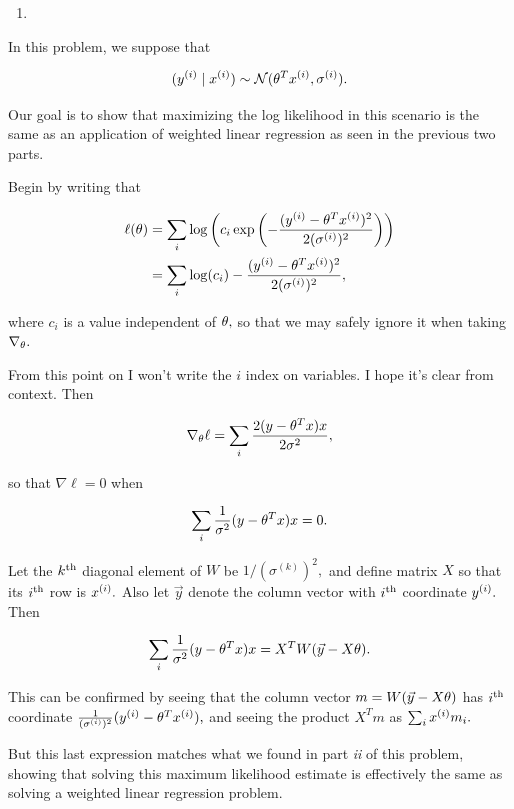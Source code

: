 \documentclass[]{article}
\begin{document}
\begin{enumerate}
\def\labelenumi{\roman{enumi}.}
\setcounter{enumi}{2}
\item
\end{enumerate}

In this problem, we suppose that

\[(y^{(i)} \mid x^{(i)}) \sim \mathcal N(\theta^T x^{(i)}, \sigma^{(i)}).\]

Our goal is to show that maximizing the log likelihood in this scenario
is the same as an application of weighted linear regression as seen in
the previous two parts.

Begin by writing that

\[\begin{aligned}
\ell(\theta) & = \sum_i \log\left(c_i \exp\left(
    -\frac{(y^{(i)} - \theta^T x^{(i)})^2}{2(\sigma^{(i)})^2}\right)\right) \\
  & = \sum_i \log(c_i) - \frac{(y^{(i)} - \theta^T x^{(i)})^2}{2(\sigma^{(i)})^2},
\end{aligned}\]

where \(c_i\) is a value independent of \(\theta,\) so that we may safely
ignore it when taking \(\nabla_\theta.\)

From this point on I won't write the \(i\) index on variables. I hope
it's clear from context. Then

\[\nabla_\theta \ell = \sum_i \frac{2(y - \theta^T x)x}{2\sigma^2},\]

so that \(\nabla\ell = 0\) when

\[\sum_i \frac{1}{\sigma^2}(y - \theta^T x)x = 0.\]

Let the \(k^\text{th}\) diagonal element of \(W\) be
\(1/(\sigma^{(k)})^2,\) and define matrix \(X\) so that its \(i^\text{th}\)
row is \(x^{(i)}.\) Also let \(\vec y\) denote the column vector with
\(i^\text{th}\) coordinate \(y^{(i)}.\) Then

\[\sum_i \frac{1}{\sigma^2}(y - \theta^T x)x = X^T W (\vec y - X\theta).\]

This can be confirmed by seeing that the column vector
\(m = W(\vec y - X\theta)\) has \(i^\text{th}\) coordinate
\(\frac{1}{(\sigma^{(i)})^2}(y^{(i)} - \theta^T x^{(i)}),\) and seeing the
product \(X^T m\) as \(\sum_i x^{(i)} m_i.\)

But this last expression matches what we found in part \emph{ii} of this
problem, showing that solving this maximum likelihood estimate is
effectively the same as solving a weighted linear regression problem.
\end{document}
